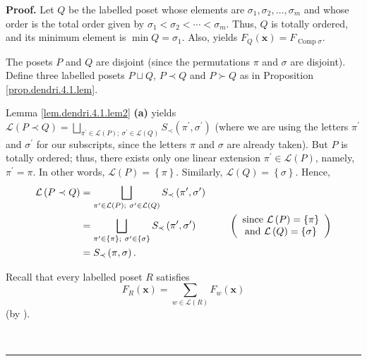 \documentclass[numbers=enddot,12pt,final,onecolumn,notitlepage]{scrartcl}%
\theoremstyle{definition}
\newenvironment{proof}[1][Proof]{\noindent\textbf{#1.} }{\ \rule{0.5em}{0.5em}}
\newenvironment{verlong}{}{}
\let\sumnonlimits\sum
\renewcommand{\sum}{\sumnonlimits\limits}
\begin{document}
\begin{verlong}
\begin{proof}
Let $Q$ be the labelled poset whose elements are $\sigma_{1},\sigma_{2}%
,\ldots,\sigma_{m}$ and whose order is the total order given by $\sigma
_{1}<\sigma_{2}<\cdots<\sigma_{m}$. Thus, $Q$ is totally ordered, and its
minimum element is $\min Q=\sigma_{1}$. Also, \cite[Proposition 5.2.10]%
{HopfComb} yields $F_{Q}\left(  \mathbf{x}\right)  =F_{\operatorname*{Comp}%
\sigma}$.

The posets $P$ and $Q$ are disjoint (since the permutations $\pi$ and $\sigma$
are disjoint). Define three labelled posets $P\sqcup Q$, $P\left.
\prec\right.  Q$ and $P\left.  \succ\right.  Q$ as in Proposition
\ref{prop.dendri.4.1.lem}.

Lemma \ref{lem.dendri.4.1.lem2} \textbf{(a)} yields $\mathcal{L}\left(
P\left.  \prec\right.  Q\right)  =\bigsqcup_{\pi^{\prime}\in\mathcal{L}\left(
P\right)  ;\ \sigma^{\prime}\in\mathcal{L}\left(  Q\right)  }S_{\prec}\left(
\pi^{\prime},\sigma^{\prime}\right)  $ (where we are using the letters
$\pi^{\prime}$ and $\sigma^{\prime}$ for our subscripts, since the letters
$\pi$ and $\sigma$ are already taken). But $P$ is totally ordered; thus, there
exists only one linear extension $\pi^{\prime}\in\mathcal{L}\left(  P\right)
$, namely, $\pi^{\prime}=\pi$. In other words, $\mathcal{L}\left(  P\right)
=\left\{  \pi\right\}  $. Similarly, $\mathcal{L}\left(  Q\right)  =\left\{
\sigma\right\}  $. Hence,%
\begin{align}
\mathcal{L}\left(  P\left.  \prec\right.  Q\right)    & =\bigsqcup
_{\pi^{\prime}\in\mathcal{L}\left(  P\right)  ;\ \sigma^{\prime}\in
\mathcal{L}\left(  Q\right)  }S_{\prec}\left(  \pi^{\prime},\sigma^{\prime
}\right) \nonumber\\
&  =\bigsqcup_{\pi^{\prime}\in\left\{  \pi\right\}  ;\ \sigma^{\prime
}\in\left\{  \sigma\right\}  }S_{\prec}\left(  \pi^{\prime},\sigma^{\prime
}\right)  \ \ \ \ \ \ \ \ \ \ \left(
\begin{array}
[c]{c}%
\text{since }\mathcal{L}\left(  P\right)  =\left\{  \pi\right\}  \\
\text{and }\mathcal{L}\left(  Q\right)  =\left\{  \sigma\right\}
\end{array}
\right)  \nonumber\\
& =S_{\prec}\left(  \pi,\sigma\right)  .\label{pf.cor.dendri.4.1.L1}%
\end{align}


Recall that every labelled poset $R$ satisfies%
\begin{equation}
F_{R}\left(  \mathbf{x}\right)  =\sum_{w\in\mathcal{L}\left(  R\right)  }%
F_{w}\left(  \mathbf{x}\right)  \label{pf.cor.dendri.4.1.FR}%
\end{equation}
(by \cite[Theorem 5.2.11]{HopfComb}).


\end{proof}
\end{verlong}
\end{document}
